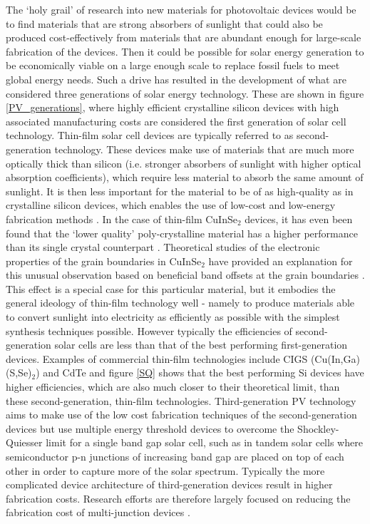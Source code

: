 The `holy grail' of research into new materials for photovoltaic devices would be to find materials that are strong absorbers of sunlight that could also be produced cost-effectively from materials that are abundant enough for large-scale fabrication of the devices. Then it could be possible for solar energy generation to be economically viable on a large enough scale to replace fossil fuels to meet global energy needs. Such a drive has resulted in the development of what are considered three generations of solar energy technology. These are shown in figure \ref{PV_generations}, where highly efficient crystalline silicon devices with high associated manufacturing costs are considered the first generation of solar cell technology.
Thin-film solar cell devices are typically referred to as second-generation technology. These devices make use of materials that are much more optically thick than silicon (i.e. stronger absorbers of sunlight with higher optical absorption coefficients), which require less material to absorb the same amount of sunlight. It is then less important for the material to be of as high-quality as in crystalline silicon devices, which enables the use of low-cost and low-energy fabrication methods \cite{emerging_pv}. 
In the case of thin-film CuInSe$_2$ devices, it has even been found that the `lower quality' poly-crystalline material has a higher performance than its single crystal counterpart \cite{CIS1_3, CIS1_4}. Theoretical studies of the electronic properties of the grain boundaries in CuInSe$_2$ have provided an explanation for this unusual observation based on beneficial band offsets at the grain boundaries \cite{CIS1, CIS2}. This effect is a special case for this particular material, but it embodies the general ideology of thin-film technology well - namely to produce materials able to convert sunlight into electricity as efficiently as possible with the simplest synthesis techniques possible.
However typically the efficiencies of second-generation solar cells are less than that of the best performing first-generation devices. Examples of commercial thin-film technologies include CIGS (Cu(In,Ga)(S,Se)$_2$) and CdTe and figure \ref{SQ} shows that the best performing Si devices have higher efficiencies, which are also much closer to their theoretical limit, than these second-generation, thin-film technologies.
Third-generation PV technology aims to make use of the low cost fabrication techniques of the second-generation devices but use multiple energy threshold devices to overcome the Shockley-Quiesser limit for a single band gap solar cell, such as in tandem solar cells where semiconductor p-n junctions of increasing band gap are placed on top of each other in order to capture more of the solar spectrum. Typically the more complicated device architecture of third-generation devices result in higher fabrication costs. Research efforts are therefore largely focused on reducing the fabrication cost of multi-junction devices \cite{3rd_gen}.\\

